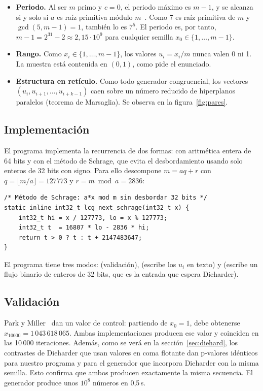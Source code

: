 \documentclass[a4paper,11pt]{article}
\begin{document}
\begin{itemize}
  \item \textbf{Periodo.} Al ser $m$ primo y $c=0$, el periodo máximo es $m-1$,
        y se alcanza si y solo si $a$ es raíz primitiva módulo $m$~\cite{riosinsua,knuth}.
        Como 7 es raíz primitiva de $m$ y $\gcd(5, m-1) = 1$, también lo es
        $7^5$. El periodo es, por tanto, $m-1 = 2^{31}-2 \approx 2{,}15\cdot10^{9}$
        para cualquier semilla $x_0 \in \{1,\dots,m-1\}$.
  \item \textbf{Rango.} Como $x_i \in \{1,\dots,m-1\}$, los valores
        $u_i = x_i/m$ nunca valen 0 ni 1. La muestra está contenida en $(0,1)$,
        como pide el enunciado.
  \item \textbf{Estructura en retículo.} Como todo generador congruencial, los
        vectores $(u_i, u_{i+1},\dots,u_{i+k-1})$ caen sobre un número reducido
        de hiperplanos paralelos (teorema de Marsaglia). Se observa en la
        figura~\ref{fig:pares}.
\end{itemize}

\subsection{Implementación}

El programa  implementa la recurrencia de dos formas: con
aritmética entera de 64 bits y con el método de Schrage, que evita el
desbordamiento usando solo enteros de 32 bits con signo. Para ello descompone
$m = aq + r$ con $q = \lfloor m/a \rfloor = 127773$ y $r = m \bmod a = 2836$:

\begin{lstlisting}
/* Método de Schrage: a*x mod m sin desbordar 32 bits */
static inline int32_t lcg_next_schrage(int32_t x) {
    int32_t hi = x / 127773, lo = x % 127773;
    int32_t t  = 16807 * lo - 2836 * hi;
    return t > 0 ? t : t + 2147483647;
}
\end{lstlisting}

El programa tiene tres modos:  (validación),  (escribe
los $u_i$ en texto) y  (escribe un flujo binario de enteros de 32
bits, que es la entrada que espera Dieharder).

\subsection{Validación}

Park y Miller~\cite{parkmiller} dan un valor de control: partiendo de $x_0 = 1$,
debe obtenerse $x_{10000} = 1\,043\,618\,065$. Ambas implementaciones producen
ese valor y coinciden en las 10\,000 iteraciones. Además, como se verá en la
sección~\ref{sec:diehard}, los contrastes de Dieharder que usan valores en coma
flotante dan p-valores idénticos para nuestro programa y para el generador
 que incorpora Dieharder con la misma semilla. Esto confirma que
ambos producen exactamente la misma secuencia. El generador produce unos
$10^8$ números en 0,5\,s.
\end{document}
